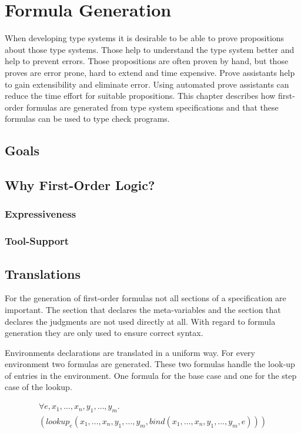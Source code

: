 \chapter{Formula Generation}
When developing type systems it is desirable to be able to prove
propositions about those type systems. Those help to understand the
type system better and help to prevent errors. Those propositions are
often proven by hand, but those proves are error prone, hard to extend
and time expensive. Prove assistants help to gain extensibility and
eliminate error. Using automated prove assistants can reduce the time
effort for suitable propositions. This chapter describes how
first-order formulas are generated from type system specifications and
that these formulas can be used to type check programs.
 
\section{Goals}
\section{Why First-Order Logic?}
\subsection{Expressiveness}
\subsection{Tool-Support}
\section{Translations}
For the generation of first-order formulas not all sections of a
specification are important. The section that declares the
meta-variables and the section that declares the judgments are not
used directly at all. With regard to formula generation they are only
used to ensure correct syntax.


Environments declarations are translated in a uniform way. For every
environment two formulas are generated. These two formulas handle the
look-up of entries in the environment. One formula for the base case
and one for the step case of the lookup.

\begin{multline}
  \forall e, x_1, \dots, x_n, y_1, \dots, y_m . \\ (lookup_e(x_1,\dots,x_n,y_1,\dots,y_m, bind(x_1,\dots,x_n,y_1,\dots,y_m,e)))
\end{multline}

